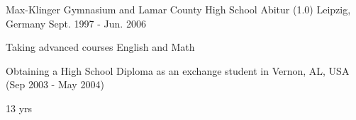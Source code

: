 \begin{cventries}
  \cventrynew
    {Max-Klinger Gymnasium and Lamar County High School} %
    {Abitur (1.0) } %
    {Leipzig, Germany} %
    {Sept. 1997 - Jun. 2006} %
    {
    \begin{cvitems}
	    \item {Taking advanced courses English and Math}
    	\item {Obtaining a High School Diploma as an exchange student in Vernon, AL, USA (Sep 2003 - May 2004)}
    \end{cvitems}
    }
    {13 yrs}

    
\end{cventries}
